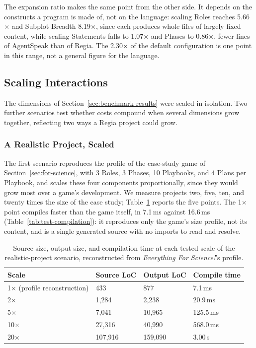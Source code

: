 The expansion ratio makes the same point from the other side. It depends on the constructs a program is made of, not on the language: scaling Roles reaches 5.66$\times$ and Subplot Breadth 8.19$\times$, since each produces whole files of largely fixed content, while scaling Statements falls to 1.07$\times$ and Phases to 0.86$\times$, fewer lines of AgentSpeak than of Regia. The 2.30$\times$ of the default configuration is one point in this range, not a general figure for the language.

\subsection{Scaling Interactions}
\label{sec:benchmark-interactions}
 
The dimensions of Section~\ref{sec:benchmark-results} were scaled in isolation. Two further scenarios test whether costs compound when several dimensions grow together, reflecting two ways a Regia project could grow.

\subsubsection{A Realistic Project, Scaled}
\label{sec:full-game-scaling}
 
The first scenario reproduces the profile of the case-study game of Section~\ref{sec:for-science}, with 3 Roles, 3 Phases, 10 Playbooks, and 4 Plans per Playbook, and scales these four components proportionally, since they would grow most over a game's development. We measure projects two, five, ten, and twenty times the size of the case study; Table~\ref{tab:full-game-scaling-points} reports the five points. The 1$\times$ point compiles faster than the game itself, in 7.1\,ms against 16.6\,ms (Table~\ref{tab:test-compilation}): it reproduces only the game's size profile, not its content, and is a single generated source with no imports to read and resolve.

\begin{table}[h]
\centering
\begin{tabular}{|l|l|l|l|}
\hline
\textbf{Scale} & \textbf{Source LoC} & \textbf{Output LoC} & \textbf{Compile time} \\
\hline
1$\times$ (profile reconstruction) & 433 & 877 & 7.1\,ms \\
2$\times$ & 1{,}284 & 2{,}238 & 20.9\,ms \\
5$\times$ & 7{,}041 & 10{,}965 & 125.5\,ms \\
10$\times$ & 27{,}316 & 40{,}990 & 568.0\,ms \\
20$\times$ & 107{,}916 & 159{,}090 & 3.00\,s \\
\hline
\end{tabular}
\caption{Source size, output size, and compilation time at each tested scale of the realistic-project scenario, reconstructed from \emph{Everything For Science!}'s profile.}
\label{tab:full-game-scaling-points}
\end{table}
 
